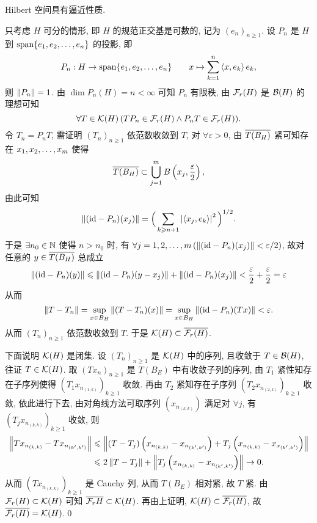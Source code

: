     \begin{Theorem}
        Hilbert 空间具有逼近性质.
    \end{Theorem}
    \begin{Proof}
        只考虑 $ H $ 可分的情形, 即 $ H $ 的规范正交基是可数的, 记为 $ (e_{n})_{n\geqslant1} $. 设 $ P_{n} $ 是 $ H $ 到 $ \Span\{ \seq{e} \} $ 的投影, 即
        \[
            P_{n}: H\to\Span\{ \seq{e} \}\qquad x\mapsto \sum_{k=1}^{n}\lrangle{x, e_{k}}e_{k},
        \]
        则 $ \norm{P_{n}}=1 $. 由 $ \dim P_{n}(H)=n<\infty $ 可知 $ P_{n} $ 有限秩, 由 $ \Fr(H) $ 是 $ \CB(H) $ 的理想可知
        \[
            \forall T\in\CK(H)\,(TP_{n}\in\Fr(H)\land P_{n}T\in\Fr(H)).
        \]
        令 $ T_{n}=P_{n}T $, 需证明 $ (T_{n})_{n\geqslant1} $ 依范数收敛到 $ T $, 对 $ \forall\varepsilon>0 $, 由 $ \baro{T(B_{H})} $ 紧可知存在 $ \seq[m]{x} $ 使得
        \[
            \baro{T(B_{H})}\subset\bigcup_{j=1}^{m}B\left(x_{j}, \frac{\varepsilon}{2}\right),
        \]
        由此可知
        \[
            \norm{(\id -P_{n})(x_{j})}=\Big( \sum_{k\geqslant n+1} \abs{\lrangle{x_{j}, e_{k}}}^{2} \Big)^{1/2}.
        \]
        于是 $ \exists n_{0}\in\N $ 使得 $ n>n_{0} $ 时, 有 $ \forall j= 1, 2, \dots, m\,(\norm{(\id-P_{n})(x_{j})}<\varepsilon/2) $, 故对任意的 $ y\in\baro{T(B_{H})} $ 总成立
        \[
            \norm{(\id-P_{n})(y)}\leqslant\norm{(\id-P_{n})(y-x_{j})}+\norm{(\id-P_{n})(x_{j})}<\frac{\varepsilon}{2}+\frac{\varepsilon}{2}=\varepsilon
        \]
        从而
        \[
            \norm{T-T_{n}}=\sup_{x\in B_{H}}\norm{(T-T_{n})(x)}=\sup_{x\in B_{H}}\norm{(\id-P_{n})(Tx)}<\varepsilon.
        \]
        从而 $ (T_{n})_{n\geqslant1} $ 依范数收敛到 $ T $. 于是 $ \CK(H)\subset\baro{\Fr(H)} $.

        下面说明 $ \CK(H) $ 是闭集. 设 $ (T_{n})_{n\geqslant1} $ 是 $ \CK(H) $ 中的序列, 且收敛于 $ T\in\CB(H) $, 往证 $ T\in\CK(H) $. 取 $ (Tx_{n})_{n\geqslant1} $ 是 $ T(B_{E}) $ 中有收敛子列的序列, 由 $ T_{1} $ 紧性知存在子序列使得 $ \left(T_{1}x_{n_{(1, k)}}\right)_{k\geqslant1} $ 收敛. 再由 $ T_{2} $ 紧知存在子序列 $ \left(T_{2}x_{n_{(2, k)}}\right)_{k\geqslant1} $ 收敛, 依此进行下去, 由对角线方法可取序列 $ \left(x_{n_{(k, k)}}\right) $ 满足对 $ \forall j $, 有 $ \left(T_{j}x_{n_{(k, k)}}\right)_{k\geqslant1} $ 收敛, 则
        \[
            \begin{aligned}
                \norm{Tx_{n_{(k, k)}}-Tx_{n_{(k', k')}}} & \leqslant \norm{(T-T_{j})\left(x_{n_{(k, k)}}-x_{n_{(k', k')}}\right)+T_{j}\left(x_{n_{(k, k)}}-x_{x_{(k', k')}}\right)}\\
                & \leqslant 2\norm{T-T_{j}}+\norm{T_{j}\left(x_{n_{(k, k)}}-x_{n_{(k', k')}}\right)}\to 0.
            \end{aligned}
        \] 
        从而 $ \left( Tx_{n_{(k, k)}} \right)_{k\geqslant1} $ 是 Cauchy 列, 从而 $ T(B_{E}) $ 相对紧, 故 $ T $ 紧. 由 $ \Fr(H)\subset\CK(H) $ 可知 $ \baro{\Fr{H}}\subset \CK(H) $. 再由上证明, $ \CK(H)\subset\baro{\Fr(H)} $, 故 $ \baro{\Fr(H)}=\CK(H) $.\qed
    \end{Proof}

